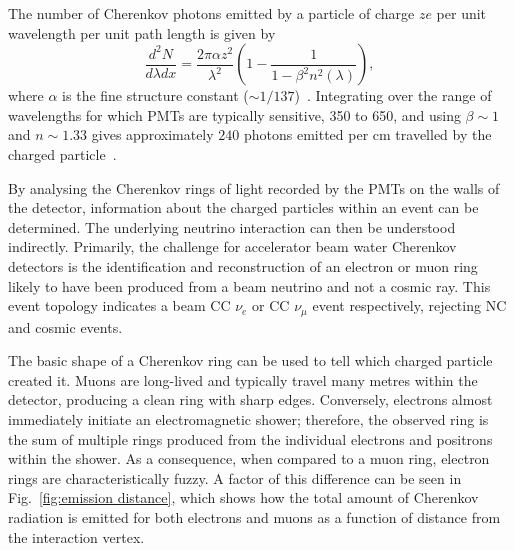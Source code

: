 The number of Cherenkov photons emitted by a particle of charge $ze$ per unit wavelength per unit
path length is given by
\begin{equation}
    \frac{d^{2}N}{d\lambda dx}=\frac{2\pi\alpha z^{2}}{\lambda^{2}}
    \left(1-\frac{1}{1-\beta^{2}n^{2}(\lambda)}\right),
    \label{eq:cherenkov_emission}
\end{equation}
where $\alpha$ is the fine structure constant ($\sim1/137$)~\cite{particle2020}. Integrating over
the range of wavelengths for which PMTs are typically sensitive, \unit{350}{} to
\unit{650}{}, and using $\beta\sim 1$ and $n\sim 1.33$ gives approximately $240$ photons
emitted per cm travelled by the charged particle~\cite{perch2017}.

By analysing the Cherenkov rings of light recorded by the PMTs on the walls of the detector,
information about the charged particles within an event can be determined. The underlying neutrino
interaction can then be understood indirectly. Primarily, the challenge for accelerator beam water
Cherenkov detectors is the identification and reconstruction of an electron or muon ring likely to
have been produced from a beam neutrino and not a cosmic ray. This event topology indicates a beam
CC $\nu_{e}$ or CC $\nu_{\mu}$ event respectively, rejecting NC and cosmic events.

The basic shape of a Cherenkov ring can be used to tell which charged particle created it. Muons
are long-lived and typically travel many metres within the detector, producing a clean ring with
sharp edges. Conversely, electrons almost immediately initiate an electromagnetic shower;
therefore, the observed ring is the sum of multiple rings produced from the individual electrons
and positrons within the shower. As a consequence, when compared to a muon ring, electron rings
are characteristically fuzzy. A factor of this difference can be seen in Fig.~\ref{fig:emission
    distance}, which shows how the total amount of Cherenkov radiation is emitted for both electrons
and muons as a function of distance from the interaction vertex.

